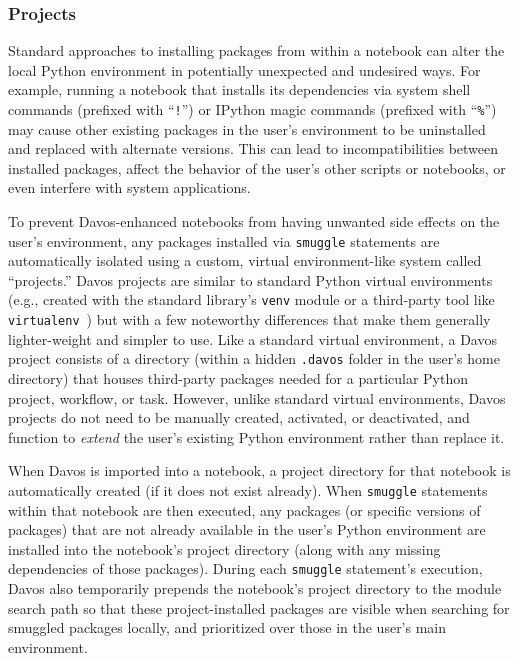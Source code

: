 \documentclass[preprint,12pt,a4paper]{elsarticle}
\begin{document}
\subsubsection{Projects}\label{subsec:projects}

Standard approaches to installing packages from within a notebook can alter the local Python environment in potentially unexpected and undesired ways.
For example, running a notebook that installs its dependencies via system shell commands (prefixed with ``\texttt{!}'') or IPython magic commands (prefixed with ``\texttt{\%}'') may cause other existing packages in the user's environment to be uninstalled and replaced with alternate versions.
This can lead to incompatibilities between installed packages, affect the behavior of the user's other scripts or notebooks, or even interfere with system applications.

To prevent Davos-enhanced notebooks from having unwanted side effects on the user's environment, any packages installed via \texttt{smuggle} statements are automatically isolated using a custom, virtual environment-like system called ``projects.''
Davos projects are similar to standard Python virtual environments (e.g., created with the standard library's \texttt{venv} module or a third-party tool like \texttt{virtualenv}~\cite{BickEtal07}) but with a few noteworthy differences that make them generally lighter-weight and simpler to use.
Like a standard virtual environment, a Davos project consists of a directory (within a hidden \texttt{.davos} folder in the user's home directory) that houses third-party packages needed for a particular Python project, workflow, or task.
However, unlike standard virtual environments, Davos projects do not need to be manually created, activated, or deactivated,
and function to \textit{extend} the user's existing Python environment rather than replace it.

When Davos is imported into a notebook, a project directory for that notebook is automatically created (if it does not exist already).
When \texttt{smuggle} statements within that notebook are then executed, any packages (or specific versions of packages) that are not already available in the user's Python environment are installed into the notebook's project directory (along with any missing dependencies of those packages).
During each \texttt{smuggle} statement's execution, Davos also temporarily prepends the notebook's project directory to the module search path so that these project-installed packages are visible when searching for smuggled packages locally, and prioritized over those in the user's main environment.
\end{document}
